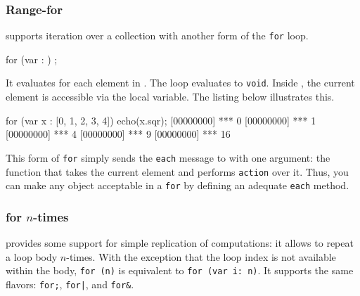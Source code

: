 \subsubsection{Range-for}
\label{sec:lang:for:each}

\us supports iteration over a collection with another form of the
\lstinline|for| loop.

\begin{urbiunchecked}
for (var  : )
   ;
\end{urbiunchecked}

It evaluates  for each element in . The loop
evaluates to \lstinline|void|.  Inside , the current element
is accessible via the  local variable. The listing below
illustrates this.

\begin{urbiscript}
for (var x : [0, 1, 2, 3, 4])
  echo(x.sqr);
[00000000] *** 0
[00000000] *** 1
[00000000] *** 4
[00000000] *** 9
[00000000] *** 16
\end{urbiscript}

This form of \lstinline|for| simply sends the \lstinline|each| message
to  with one argument: the function that takes the
current element and performs \lstinline|action| over it. Thus, you can
make any object acceptable in a \lstinline|for| by defining an
adequate \lstinline|each| method.


\subsubsection{for \texorpdfstring{$n$}{n}-times}
\label{sec:lang:for:n}

\us provides some support for simple replication of computations: it allows
to repeat a loop body $n$-times.  With the exception that the loop index is
not available within the body, \lstinline|for (n)| is equivalent to
\lstinline|for (var i: n)|.  It supports the same flavors: \lstinline|for;|,
\lstinline{for|}, and \lstinline|for&|.

